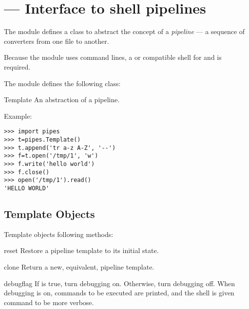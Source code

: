 \section{ ---
         Interface to shell pipelines}



The  module defines a class to abstract the concept of
a \emph{pipeline} --- a sequence of converters from one file to 
another.

Because the module uses  command lines, a \POSIX{} or
compatible shell for  and 
is required.

The  module defines the following class:

\begin{classdesc}{Template}{}
An abstraction of a pipeline.
\end{classdesc}

Example:

\begin{verbatim}
>>> import pipes
>>> t=pipes.Template()
>>> t.append('tr a-z A-Z', '--')
>>> f=t.open('/tmp/1', 'w')
>>> f.write('hello world')
>>> f.close()
>>> open('/tmp/1').read()
'HELLO WORLD'
\end{verbatim}


\subsection{Template Objects \label{template-objects}}

Template objects following methods:

\begin{methoddesc}[Template]{reset}{}
Restore a pipeline template to its initial state.
\end{methoddesc}

\begin{methoddesc}[Template]{clone}{}
Return a new, equivalent, pipeline template.
\end{methoddesc}

\begin{methoddesc}[Template]{debug}{flag}
If  is true, turn debugging on. Otherwise, turn debugging
off. When debugging is on, commands to be executed are printed, and
the shell is given  command to be more verbose.
\end{methoddesc}

